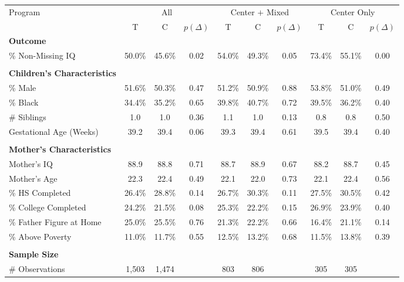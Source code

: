 \begin{tabular}{lccccccccc}
\toprule 
\midrule 
Program & \multicolumn{3}{c}{All} & \multicolumn{3}{c}{Center $+$ Mixed} & \multicolumn{3}{c}{Center Only} \\
 \cmidrule(lr){1-1} \cmidrule(lr){2-4} \cmidrule(lr){5-7} \cmidrule(lr){8-10} 
 & T & C & $p(\Delta)$ & T & C & $p(\Delta)$ & T & C & $p(\Delta)$ \\
\midrule 
\textbf{Outcome} \\
\quad \% Non-Missing IQ & 50.0\% & 45.6\% & 0.02 & 54.0\% & 49.3\% & 0.05 & 73.4\% & 55.1\% & 0.00 \\
 \\
\textbf{Children's Characteristics} \\
\quad \% Male & 51.6\% & 50.3\% & 0.47 & 51.2\% & 50.9\% & 0.88 & 53.8\% & 51.0\% & 0.49 \\
\quad \% Black & 34.4\% & 35.2\% & 0.65 & 39.8\% & 40.7\% & 0.72 & 39.5\% & 36.2\% & 0.40 \\
\quad \# Siblings & 1.0 & 1.0 & 0.36 & 1.1 & 1.0 & 0.13 & 0.8 & 0.8 & 0.50 \\
\quad Gestational Age (Weeks) & 39.2 & 39.4 & 0.06 & 39.3 & 39.4 & 0.61 & 39.5 & 39.4 & 0.40 \\
 \\
\textbf{Mother's Characteristics} \\
\quad Mother's IQ & 88.9 & 88.8 & 0.71 & 88.7 & 88.9 & 0.67 & 88.2 & 88.7 & 0.45 \\
\quad Mother's Age & 22.3 & 22.4 & 0.49 & 22.1 & 22.0 & 0.73 & 22.1 & 22.4 & 0.56 \\
\quad \% HS Completed & 26.4\% & 28.8\% & 0.14 & 26.7\% & 30.3\% & 0.11 & 27.5\% & 30.5\% & 0.42 \\
\quad \% College Completed & 24.2\% & 21.5\% & 0.08 & 25.3\% & 22.2\% & 0.15 & 26.9\% & 23.9\% & 0.40 \\
\quad \% Father Figure at Home & 25.0\% & 25.5\% & 0.76 & 21.3\% & 22.2\% & 0.66 & 16.4\% & 21.1\% & 0.14 \\
\quad \% Above Poverty & 11.0\% & 11.7\% & 0.55 & 12.5\% & 13.2\% & 0.68 & 11.5\% & 13.8\% & 0.39 \\
 \\
\textbf{Sample Size} \\
\quad \# Observations & 1,503 & 1,474 &  & 803 & 806 &  & 305 & 305 &  \\
\midrule 
\bottomrule 
\end{tabular}
